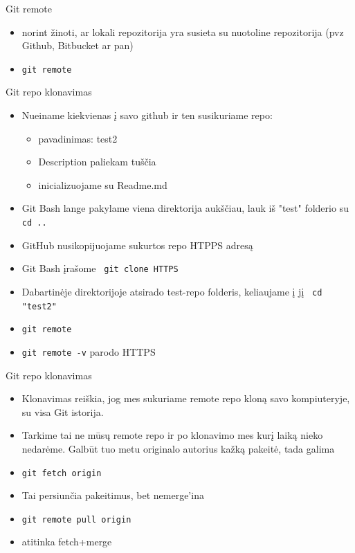 \documentclass[11pt,xcolor=table]{beamer}
\begin{document}
\begin{frame}{Git remote}
\begin{itemize}
\item norint žinoti, ar lokali repozitorija yra susieta su nuotoline repozitorija (pvz Github, Bitbucket ar pan)
\item \colorbox{listinggray}{\lstinline|git remote|}
\end{itemize}
\end{frame}


\begin{frame}{Git repo klonavimas}
\begin{itemize}
\item Nueiname kiekvienas į savo github ir ten susikuriame repo:
\begin{itemize}
\item pavadinimas: test2
\item Description paliekam tuščia
\item inicializuojame su Readme.md
\end{itemize}
\item Git Bash lange pakylame viena direktorija aukščiau, lauk iš "test" folderio su \colorbox{listinggray}{\lstinline|cd ..|}
\item GitHub nusikopijuojame sukurtos repo HTPPS adresą
\item Git Bash  įrašome \colorbox{listinggray}{\lstinline| git clone HTTPS|}
\item Dabartinėje direktorijoje atsirado test-repo folderis, keliaujame į jį \colorbox{listinggray}{\lstinline| cd "test2"|} 
\item \colorbox{listinggray}{\lstinline|git remote|}
\item \colorbox{listinggray}{\lstinline|git remote -v|} parodo HTTPS
\end{itemize}
\end{frame}


\begin{frame}{Git repo klonavimas}
\begin{itemize}
\item Klonavimas reiškia, jog mes sukuriame remote repo kloną savo kompiuteryje, su visa Git istorija.
\item Tarkime tai ne mūsų remote repo ir po klonavimo mes kurį laiką nieko nedarėme. Galbūt tuo metu  originalo autorius kažką pakeitė, tada galima
\item \colorbox{listinggray}{\lstinline|git fetch origin|}
\item Tai persiunčia pakeitimus, bet nemerge'ina
\item \colorbox{listinggray}{\lstinline|git remote pull origin|}
\item atitinka fetch+merge
\end{itemize}
\end{frame}
\end{document}

